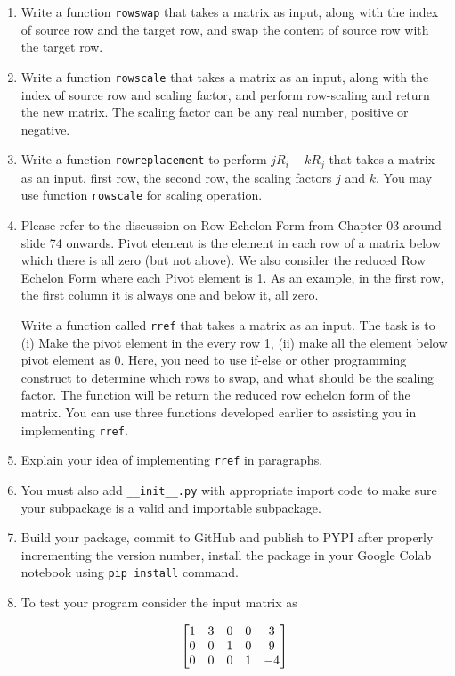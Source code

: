 \documentclass[12pt, xcolor=dvipsnames,svgnames,x11names]{article}
\makeatletter
\newenvironment{multiequation}[1][]{%
\begin{equation}%
   \begin{aligned}%
   \ifx#1\@empty\else\label{#1}\fi%
}{%
   \end{aligned}%
\end{equation}%
}
\makeatother
\begin{document}
\begin{enumerate}
   \item Write a function \texttt{rowswap} that takes a matrix as input, along with the index of source row and the target row, and swap the content of source row with the target row.
   \item Write a function \texttt{rowscale} that takes a matrix as an input, along with the index of source row and scaling factor, and perform row-scaling and return the new matrix. The scaling factor can be any real number, positive or negative.
   \item Write a function \texttt{rowreplacement} to perform $jR_i + kR_j$ that takes a matrix as an input, first row, the second row, the scaling factors $j$ and $k$. You may use function \texttt{rowscale} for scaling operation.
   \item Please refer to the discussion on Row Echelon Form from Chapter 03 around slide 74 onwards. Pivot element is the element in each row of a matrix below which there is all zero (but not above). We also consider the reduced Row Echelon Form where each Pivot element is 1. As an example, in the first row, the first column it is always one and below it, all zero.
   
   Write a function called \texttt{rref} that takes a matrix as an input. The task is to (i) Make the pivot element in the every row 1, (ii) make all the element below pivot element as 0. Here, you need to use if-else or other programming construct to determine which rows to swap, and what should be the scaling factor. The function will be return the reduced row echelon form of the matrix. You can use three functions developed earlier to assisting you in implementing \texttt{rref}.
   \item Explain your idea of implementing \texttt{rref} in paragraphs.
   \item You must also add \texttt{\_\_init\_\_.py} with appropriate import code to make sure your subpackage is a valid and importable subpackage.
   \item Build your package, commit to GitHub and publish to PYPI after properly incrementing the version number, install the package in your Google Colab notebook using \texttt{pip install} command.
   \item To test your program consider the input matrix as 
   
   \begin{multiequation}
      \begin{bmatrix}
      1 & 3 & 0 & 0 & 3\\
      0 & 0 & 1 & 0 & 9\\
      0 & 0 & 0 & 1 & -4
   \end{bmatrix}
   \end{multiequation}


\end{enumerate}
\end{document}
